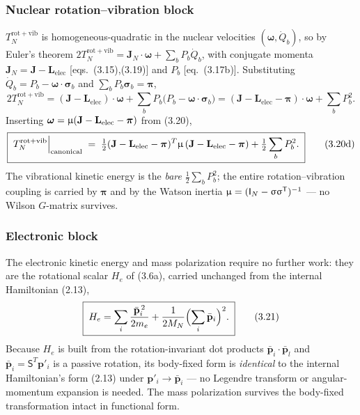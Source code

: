 \subsubsection{Nuclear rotation--vibration block}

$T_N^{\mathrm{rot+vib}}$ is homogeneous-quadratic in the nuclear velocities $(\boldsymbol{\omega},\dot Q_b)$, so by Euler's theorem $2T_N^{\mathrm{rot+vib}}=\mathbf{J}_N\!\cdot\!\boldsymbol{\omega}+\sum_b P_b\dot Q_b$, with conjugate momenta $\mathbf{J}_N=\mathbf{J}-\mathbf{L}_{\mathrm{elec}}$ [eqs.~(3.15),(3.19)] and $P_b$ [eq.~(3.17b)]. Substituting $\dot Q_b=P_b-\boldsymbol{\omega}\!\cdot\!\boldsymbol{\sigma}_b$ and $\sum_b P_b\boldsymbol{\sigma}_b=\boldsymbol{\pi}$,
\begin{equation*}
2T_N^{\mathrm{rot+vib}}=(\mathbf{J}-\mathbf{L}_{\mathrm{elec}})\!\cdot\!\boldsymbol{\omega}+\sum_bP_b\bigl(P_b-\boldsymbol{\omega}\!\cdot\!\boldsymbol{\sigma}_b\bigr)=(\mathbf{J}-\mathbf{L}_{\mathrm{elec}}-\boldsymbol{\pi})\!\cdot\!\boldsymbol{\omega}+\sum_bP_b^2 .
\end{equation*}
Inserting $\boldsymbol{\omega}=\upmu(\mathbf{J}-\mathbf{L}_{\mathrm{elec}}-\boldsymbol{\pi})$ from (3.20),
\begin{equation}
\boxed{\;T_N^{\mathrm{rot+vib}}\Big|_{\mathrm{canonical}} \;=\; \tfrac12(\mathbf{J}-\mathbf{L}_{\mathrm{elec}}-\boldsymbol{\pi})^{T}\upmu\,(\mathbf{J}-\mathbf{L}_{\mathrm{elec}}-\boldsymbol{\pi}) + \tfrac12\sum_{b}P_b^2.\;} \tag{3.20d}
\end{equation}
The vibrational kinetic energy is the \emph{bare} $\tfrac12\sum_bP_b^2$; the entire rotation--vibration coupling is carried by $\boldsymbol{\pi}$ and by the Watson inertia $\upmu=(\mathsf{I}_N-\upsigma\upsigma^{\mathsf T})^{-1}$ --- no Wilson $G$-matrix survives.

\subsubsection{Electronic block}

The electronic kinetic energy and mass polarization require no further work: they are the rotational scalar $H_e$ of (3.6a), carried unchanged from the internal Hamiltonian (2.13),
\begin{equation}
\boxed{\;H_e=\sum_i\frac{\bar{\mathbf{p}}_i^{\,2}}{2m_e}+\frac{1}{2M_N}\Bigl(\sum_i\bar{\mathbf{p}}_i\Bigr)^{2}.\;} \tag{3.21}
\end{equation}
Because $H_e$ is built from the rotation-invariant dot products $\bar{\mathbf{p}}_i\!\cdot\!\bar{\mathbf{p}}_l$ and $\bar{\mathbf{p}}_i=\mathsf{S}^{T}\mathbf{p}'_i$ is a passive rotation, its body-fixed form is \emph{identical} to the internal Hamiltonian's form (2.13) under $\mathbf{p}'_i\to\bar{\mathbf{p}}_i$ --- no Legendre transform or angular-momentum expansion is needed. The mass polarization survives the body-fixed transformation intact in functional form.

